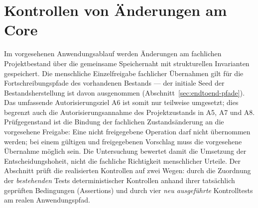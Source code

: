 
\section{Kontrollen von Änderungen am Core}
\label{sec:eval-kontrollen}

Im vorgesehenen Anwendungsablauf werden Änderungen am fachlichen
Projektbestand über die gemeinsame Speichernaht mit strukturellen
Invarianten gespeichert. Die menschliche
Einzelfreigabe fachlicher Übernahmen gilt für die
Fortschreibungspfade des vorhandenen Bestands --- der initiale Seed
der Bestandsherstellung ist davon ausgenommen
(Abschnitt~\ref{sec:endtoend-pfade}). Das umfassende
Autorisierungsziel A6 ist somit nur teilweise umgesetzt; dies
begrenzt auch die Autorisierungsannahme des Projektzustands in A5,
A7 und A8. Prüfgegenstand ist die Bindung der fachlichen
Zustandsänderung an die vorgesehene Freigabe: Eine nicht freigegebene
Operation darf nicht übernommen werden; bei einem gültigen und
freigegebenen Vorschlag muss die vorgesehene Übernahme möglich sein.
Die Untersuchung bewertet
damit die Umsetzung der Entscheidungshoheit, nicht die fachliche
Richtigkeit menschlicher Urteile. Der Abschnitt prüft die
realisierten Kontrollen auf zwei Wegen: durch die
Zuordnung der \emph{bestehenden} Tests deterministischer Kontrollen
anhand ihrer tatsächlich geprüften Bedingungen (Assertions) und durch
vier \emph{neu ausgeführte} Kontrolltests am realen
Anwendungspfad.

